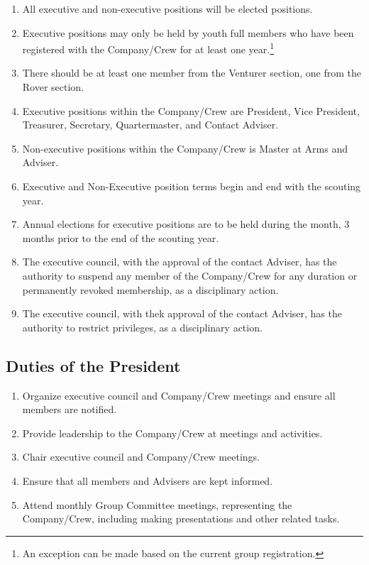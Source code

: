 \begin{enumerate}
    \item All executive and non-executive positions will be elected positions.
    \item Executive positions may only be held by youth full members who have been registered with the Company/Crew for at least one year.\footnote{An exception can be made based on the current group registration.}
    \item There should be at least one member from the Venturer section, one from the Rover section. \footnotemark[\value{footnote}]
    \item Executive positions within the Company/Crew are President, Vice President, Treasurer, Secretary, Quartermaster, and Contact Adviser.
    \item Non-executive positions within the Company/Crew is Master at Arms and Adviser.
    \item Executive and Non-Executive position terms begin and end with the scouting year.
    \item Annual elections for executive positions are to be held during the month, 3 months prior to the end of the scouting year.
    \item The executive council, with the approval of the contact Adviser, has the authority to suspend any member of the Company/Crew for any duration or permanently revoked membership, as a disciplinary action.
    \item The executive council, with thek approval of the contact Adviser, has the authority to restrict privileges, as a disciplinary action.
\end{enumerate}

\subsection{Duties of the President}
\begin{enumerate}
    \item Organize executive council and Company/Crew meetings and ensure all members are notified.
    \item Provide leadership to the Company/Crew at meetings and activities.
    \item Chair executive council and Company/Crew meetings.
    \item Ensure that all members and Advisers are kept informed.
    \item Attend monthly Group Committee meetings, representing the Company/Crew, including making presentations and other related tasks.
\end{enumerate}

